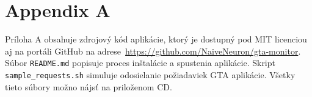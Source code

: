 \chapter*{Appendix A}

Príloha A obsahuje zdrojový kód aplikácie, ktorý je dostupný pod MIT licenciou aj na
portáli GitHub na adrese~\url{https://github.com/NaiveNeuron/gta-monitor}.
Súbor \verb'README.md' popisuje proces inštalácie a spustenia aplikácie. Skript
\verb'sample_requests.sh' simuluje odosielanie požiadaviek GTA aplikácie.
Všetky tieto súbory možno nájsť na priloženom CD.